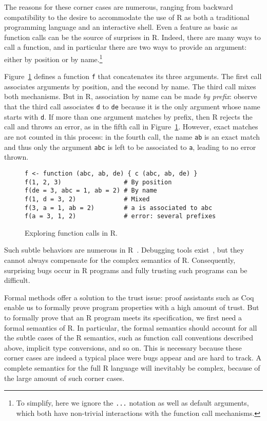 \documentclass[
    sigplan,
    10pt,
    review, %
    natbib=false %
 ]{acmart}
\newcommand\et[1]{\todo[color=blue!20,size=\scriptsize]{#1}}
\begin{document}
The reasons for these corner cases are numerous, ranging from backward compatibility to the desire to accommodate the use of R as both a traditional programming language and an interactive shell.
Even a feature as basic as function calls can be the source of surprises in R. 
Indeed, there are many ways to call a function, and in particular there are two ways to provide an argument: either by position or by name.\footnote{
    To simplify, here we ignore the \texttt{...} notation
    as well as default arguments, which both have non-trivial interactions with the function call mechanisms.}

Figure~\ref{fig:calls} defines a function \texttt{f} that concatenates its three arguments. The first call associates arguments by position, and the second by name. The third call mixes both mechanisms. But in R, 
association by name can be made {\em by prefix}:
observe that the third call associates \texttt{d} to \texttt{de}
because it is the only argument whose name starts with \texttt{d}.
If more than one argument matches by prefix,
then R rejects the call and throws an error,
as in the fifth call in Figure~\ref{fig:calls}.
However, exact matches are not counted in this process:
in the fourth call,
the name \texttt{ab} is an exact match
and thus only the argument \texttt{abc}
is left to be associated to \texttt{a},
leading to no error thrown.

\begin{figure}[t]
\begin{verbatim}
f <- function (abc, ab, de) { c (abc, ab, de) }
f(1, 2, 3)                 # By position
f(de = 3, abc = 1, ab = 2) # By name
f(1, d = 3, 2)             # Mixed
f(3, a = 1, ab = 2)        # a is associated to abc
f(a = 3, 1, 2)             # error: several prefixes
\end{verbatim}
\caption{Exploring function calls in R.}
\label{fig:calls}
\end{figure}

Such subtle behaviors are numerous in R~\parencite{RInferno}.
Debugging tools exist~\parencite{mcpherson2014},
but they cannot always compensate for the complex semantics of R.
Consequently, surprising bugs occur in R programs
and fully trusting such programs can be difficult.

Formal methods offer a solution to the trust issue:
proof assistants such as Coq~\parencite{Coq} enable us
to formally prove program properties with a high amount of trust.
But to formally prove that an R program meets its specification,
we first need a formal semantics of R. \et{mention the on-going spec effort and its limits} 
In particular, the formal semantics should account for all the subtle cases of the R semantics, such as function call conventions described above, implicit type conversions, and so on.
This is necessary because these corner cases are indeed a typical place were bugs appear and are hard to track. 
A complete semantics for the full R language will inevitably be complex,
because of the large amount of such corner cases.
\end{document}
